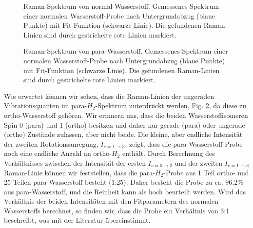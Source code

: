 \documentclass[11pt]{article}
\begin{document}
\begin{figure}[htbp]
	\centering
   \caption{\small Raman-Spektrum von normal-Wasserstoff. Gemessenes Spektrum einer normalen Wasserstoff-Probe nach Untergrundabzug (blaue Punkte) mit Fit-Funktion (schwarze Linie). Die gefundenen Raman-Linien sind durch gestrichelte rote Linien markiert.}
   \label{fig:normal_H2}
\end{figure}

\begin{figure}[htbp]
	\centering
   \caption{\small Raman-Spektrum von para-Wasserstoff. Gemessenes Spektrum einer normalen Wasserstoff-Probe nach Untergrundabzug (blaue Punkte) mit Fit-Funktion (schwarze Linie). Die gefundenen Raman-Linien sind durch gestrichelte rote Linien markiert.}
   \label{fig:para_H2}
\end{figure}

Wie erwartet können wir sehen, dass die Raman-Linien der ungeraden Vibrationsquanten im para-$H_2$-Spektrum unterdrückt werden, Fig. \ref{fig:para_H2}, da diese zu ortho-Wasserstoff gehören. Wir erinnern uns, dass die beiden Wasserstoffisomeren Spin 0 (para) und 1 (ortho) besitzen und daher nur gerade (para) oder ungerade (ortho) Zustände zulassen, aber nicht beide. Die kleine, aber endliche Intensität der zweiten Rotationsanregung, $I_{\nu  = 1 \to 3}$, zeigt, dass die para-Wasserstoff-Probe noch eine endliche Anzahl an ortho-$H_2$ enthält. Durch Berechnung des Verhältnisses zwischen der Intensität der ersten $I_{\nu  = 0 \to 2}$ und der zweiten $I_{\nu  = 1 \to 3}$ Raman-Linie können wir feststellen, dass die para-$H_2$-Probe aus 1 Teil ortho- und 25 Teilen para-Wasserstoff besteht (1:25). Daher besteht die Probe zu ca. $96.2\%$ aus para-Wasserstoff, und die Reinheit kann als hoch beurteilt werden. Wird das Verhältnis der beiden Intensitäten mit den Fitparametern des normalen Wasserstoffs berechnet, so finden wir, dass die Probe ein Verhältnis von 3:1 beschreibt, was mit der Literatur übereinstimmt.
\end{document}
